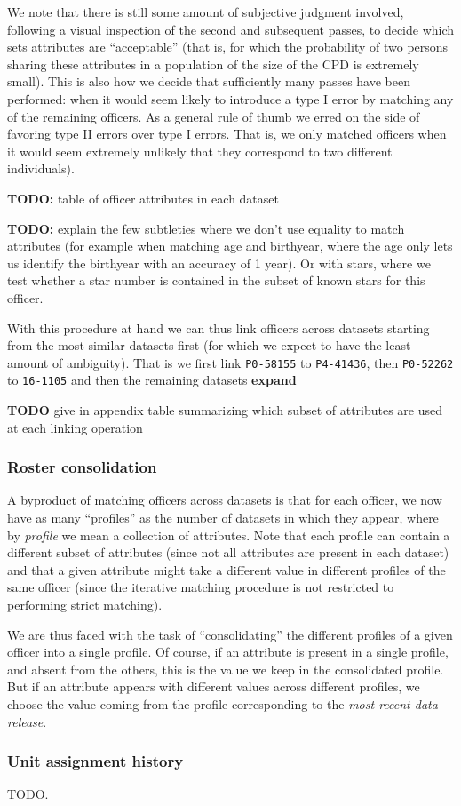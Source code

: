 We note that there is still some amount of subjective judgment involved,
following a visual inspection of the second and subsequent passes, to decide
which sets attributes are ``acceptable'' (that is, for which the probability of
two persons sharing these attributes in a population of the size of the CPD is
extremely small). This is also how we decide that sufficiently many passes have
been performed: when it would seem likely to introduce a type I error by
matching any of the remaining officers. As a general rule of thumb we erred on
the side of favoring type II errors over type I errors. That is, we only
matched officers when it would seem extremely unlikely that they correspond to
two different individuals).

\textbf{TODO:} table of officer attributes in each dataset

\textbf{TODO:} explain the few subtleties where we don't use equality to match
attributes (for example when matching age and birthyear, where the age only
lets us identify the birthyear with an accuracy of 1 year). Or with stars,
where we test whether a star number is contained in the subset of known stars
for this officer.

With this procedure at hand we can thus link officers across datasets starting
from the most similar datasets first (for which we expect to have the least
amount of ambiguity). That is we first link \texttt{P0-58155} to
\texttt{P4-41436}, then \texttt{P0-52262} to \texttt{16-1105} and then the
remaining datasets \textbf{expand}

\textbf{TODO} give in appendix table summarizing which subset of attributes are
used at each linking operation 

\subsubsection{Roster consolidation}

A byproduct of matching officers across datasets is that for each officer, we
now have as many “profiles” as the number of datasets in which they appear,
where by \emph{profile} we mean a collection of attributes. Note that each
profile can contain a different subset of attributes (since not all attributes
are present in each dataset) and that a given attribute might take a different
value in different profiles of the same officer (since the iterative matching
procedure is not restricted to performing strict matching).

We are thus faced with the task of “consolidating” the different profiles of
a given officer into a single profile. Of course, if an attribute is present in
a single profile, and absent from the others, this is the value we keep in the
consolidated profile. But if an attribute appears with different values across
different profiles, we choose the value coming from the profile corresponding
to the \emph{most recent data release}.

\subsubsection{Unit assignment history} TODO.




